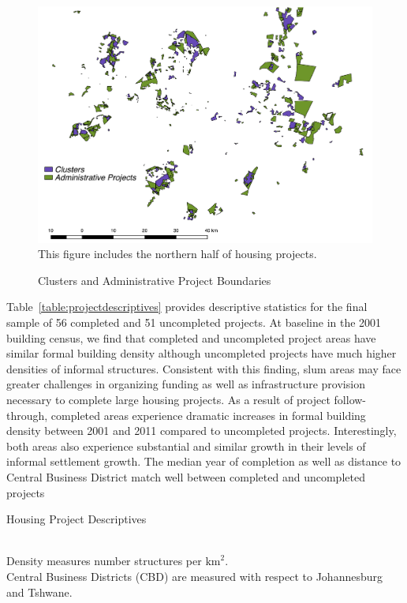 \documentclass[12pt]{article}
\begin{document}
\begin{figure}
\caption{Clusters and Administrative Project Boundaries}\label{figure:gcrooverlap}
\centering
\includegraphics[scale=.5]{figures/gcro_convexhull_overlap.pdf} \\
This figure includes the northern half of housing projects.
\end{figure}

Table~\ref{table:projectdescriptives} provides descriptive statistics for the final sample of 56 completed and 51 uncompleted projects.  At baseline in the 2001 building census, we find that completed and uncompleted project areas have similar formal building density although uncompleted projects have much higher densities of informal structures.  Consistent with this finding, slum areas may face greater challenges in organizing funding as well as infrastructure provision necessary to complete large housing projects.  As a result of project follow-through, completed areas experience dramatic increases in formal building density between 2001 and 2011 compared to uncompleted projects.  Interestingly, both areas also experience substantial and similar growth in their levels of informal settlement growth.  The median year of completion as well as distance to Central Business District match well between completed and uncompleted projects 

\begin{table}
	\centering
	\caption{Housing Project Descriptives}\label{table:projectdescriptives}
\\
Density measures number structures per $\text{km}^2$. \\  Central Business Districts (CBD) are measured with respect to Johannesburg and Tshwane.
\end{table}
\end{document}
